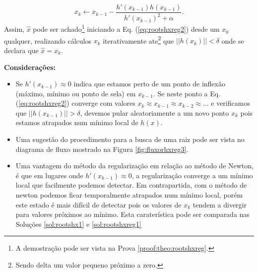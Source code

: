 \begin{theorem}
\begin{equation}\label{eq:rootshxreg2}
x_{k} \leftarrow x_{k-1}-\frac{ h'(x_{k-1})h(x_{k-1})}{h'(x_{k-1})^2+\alpha}.
\end{equation}
Assim, $\hat{x}$ pode ser achado\footnote{A 
demostração pode ser vista na Prova \ref{proof:theo:rootshxreg}.} 
iniciando a Eq. (\ref{eq:rootshxreg2}) desde um 
$x_{0}$ qualquer, realizando cálculos $x_{k}$ iterativamente  
ate\footnote{Sendo delta um valor pequeno próximo a zero.} que $||h(x_k)||<\delta$
onde se declara que $\hat{x}=x_k$.

\textbf{Considerações:}
\begin{itemize} 
\item Se $h'(x_{k-1})\approx 0$ indica que estamos perto de um ponto de inflexão 
(máximo, mínimo ou ponto de sela) em $x_{k-1}$. Se neste ponto a Eq. (\ref{eq:rootshxreg2})
converge com valores $x_k\approx x_{k-1}\approx x_{k-2}\approx ...$ e verificamos que $||h(x_{k-1})||>\delta$,
devemos pular aleatoriamente a um novo ponto $x_k$ pois estamos atrapados num mínimo local de $h(x)$.  
\item Uma sugestão do procedimento para a busca de uma raiz pode ser vista no diagrama de fluxo
mostrado na Figura \ref{fig:fluxorhxreg3}. 
\end{itemize}
\end{theorem}

\begin{tcbattention}
\begin{itemize}
\item Uma vantagem do método da regularização em relação ao método de Newton,
é que em lugares onde $h'(x_{k-1})\approx 0$, a regularização converge a um mínimo local 
que facilmente podemos detectar. Em contrapartida,
com o método de newton podemos ficar temporalmente atrapados num mínimo local, porém este estado 
é mais difícil de detectar pois os valores de $x_k$ tendem a divergir para valores próximos ao mínimo.
Esta caraterística pode ser comparada nas Soluções \ref{sol:rootshx1} e \ref{sol:rootshxreg1}
\end{itemize}
\end{tcbattention}

